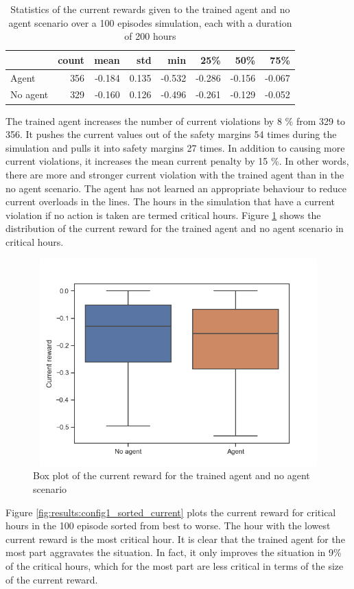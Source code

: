 \documentclass[class=book, crop=false]{standalone}
\begin{document}
\begin{table}[h]
\center
\begin{tabular}{l|rrrrrrr}
         & count & mean   & std   & min    & 25\%   & 50\%   & 75\%   \\
\hline
Agent    & 356 & -0.184 & 0.135 & -0.532 & -0.286 & -0.156 & -0.067 \\
No agent & 329 & -0.160 & 0.126 & -0.496 & -0.261 & -0.129 & -0.052 \\
\hline
\end{tabular}
\caption{Statistics of the current rewards given to the trained agent and no agent scenario over a 100 episodes simulation, each with a duration of 200 hours}
\label{table:results:configuration1_reward_100_episodes_current}
\end{table}
The trained agent increases the number of current violations by 8 \% from 329 to 356. It pushes the current values out of the safety margins 54 times during the simulation and pulls it into safety margins 27 times. In addition to causing more current violations, it increases the mean current penalty by 15 \%. In other words, there are more and stronger current violation with the trained agent than in the no agent scenario. The agent has not learned an appropriate behaviour to reduce current overloads in the lines. The hours in the simulation that have a current violation if no action is taken are termed critical hours. Figure \ref{fig:results:config1_100ep_boxplot_current} shows the distribution of the current reward for the trained agent and no agent scenario in critical hours. 

\begin{figure}[H]
    \center
\includegraphics[height=8cm, width=12cm]{figures/config1_100ep_boxplot_current.png}
    \caption[size = 9]{Box plot of the current reward for the trained agent and no agent scenario}
    \label{fig:results:config1_100ep_boxplot_current}
\end{figure}
Figure \ref{fig:results:config1_sorted_current} plots the current reward for critical hours in the 100 episode sorted from best to worse. The hour with the lowest current reward is the most critical hour. It is clear that the trained agent for the most part aggravates the situation. In fact, it only improves the situation in 9\% of the critical hours, which for the most part are less critical in terms of the size of the current reward. 
\end{document}
